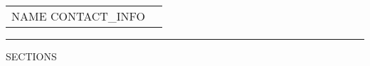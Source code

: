 \documentclass{article}
\begin{document}
\begin{tabular}{ m{3.4in} | m{3.1in} }
{\Large NAME} CONTACT_INFO
\end{tabular}

\begin{center}
\rule{\textwidth}{0.1cm}
\end{center}

SECTIONS
\end{document}
